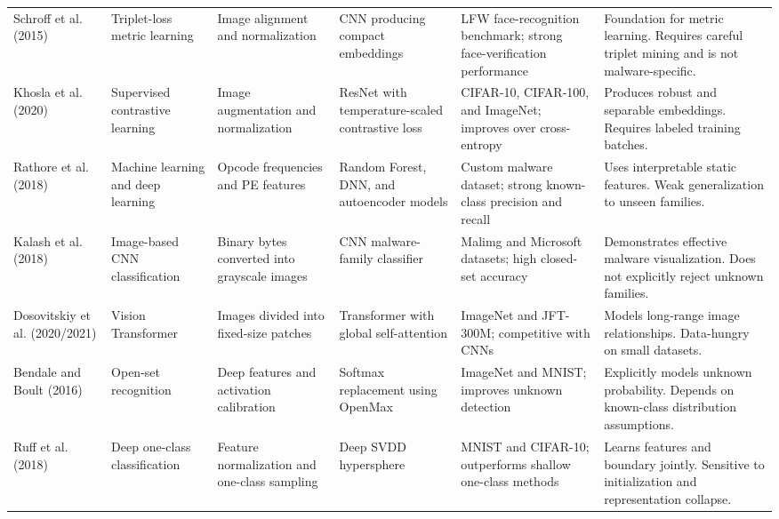 \documentclass[12pt,a4paper]{article}
\begin{document}
\begin{longtable}{
P{2.2cm}
P{2.7cm}
P{2.7cm}
P{2.8cm}
P{2.7cm}
P{4.0cm}
}
Schroff et al. (2015) \citep{schroff2015} &
Triplet-loss metric learning &
Image alignment and normalization &
CNN producing compact embeddings &
LFW face-recognition benchmark; strong face-verification performance &
Foundation for metric learning. Requires careful triplet mining and is not malware-specific. \\

Khosla et al. (2020) \citep{khosla2020} &
Supervised contrastive learning &
Image augmentation and normalization &
ResNet with temperature-scaled contrastive loss &
CIFAR-10, CIFAR-100, and ImageNet; improves over cross-entropy &
Produces robust and separable embeddings. Requires labeled training batches. \\

Rathore et al. (2018) \citep{rathore2018} &
Machine learning and deep learning &
Opcode frequencies and PE features &
Random Forest, DNN, and autoencoder models &
Custom malware dataset; strong known-class precision and recall &
Uses interpretable static features. Weak generalization to unseen families. \\

Kalash et al. (2018) \citep{kalash2018} &
Image-based CNN classification &
Binary bytes converted into grayscale images &
CNN malware-family classifier &
Malimg and Microsoft datasets; high closed-set accuracy &
Demonstrates effective malware visualization. Does not explicitly reject unknown families. \\

Dosovitskiy et al. (2020/2021) \citep{dosovitskiy2020} &
Vision Transformer &
Images divided into fixed-size patches &
Transformer with global self-attention &
ImageNet and JFT-300M; competitive with CNNs &
Models long-range image relationships. Data-hungry on small datasets. \\

Bendale and Boult (2016) \citep{bendale2016} &
Open-set recognition &
Deep features and activation calibration &
Softmax replacement using OpenMax &
ImageNet and MNIST; improves unknown detection &
Explicitly models unknown probability. Depends on known-class distribution assumptions. \\

Ruff et al. (2018) \citep{ruff2018} &
Deep one-class classification &
Feature normalization and one-class sampling &
Deep SVDD hypersphere &
MNIST and CIFAR-10; outperforms shallow one-class methods &
Learns features and boundary jointly. Sensitive to initialization and representation collapse. \\


\end{longtable}
\end{document}
